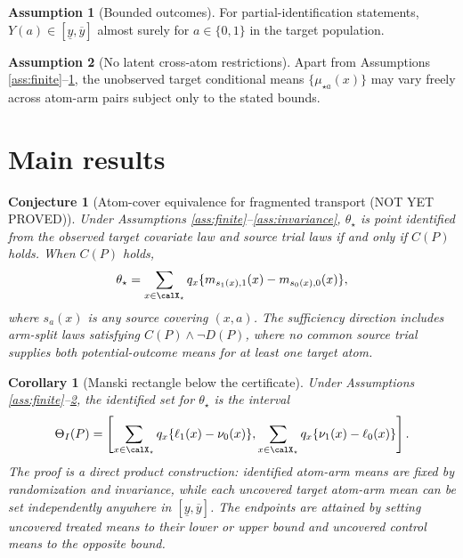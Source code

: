 \documentclass[11pt]{article}
\theoremstyle{definition}
\newtheorem{assumption}{Assumption}
\theoremstyle{plain}
\newtheorem{conjecture}{Conjecture}
\newtheorem{corollary}{Corollary}
\theoremstyle{remark}
\begin{document}
\begin{assumption}[Bounded outcomes]\label{ass:bounded}
For partial-identification statements, $Y(a)\in[\underline y,\overline y]$ almost surely for $a\in\{0,1\}$ in the target population.
\end{assumption}

\begin{assumption}[No latent cross-atom restrictions]\label{ass:no-cross}
Apart from Assumptions \ref{ass:finite}--\ref{ass:bounded}, the unobserved target conditional means $\{\mu_{\star a}(x)\}$ may vary freely across atom-arm pairs subject only to the stated bounds.
\end{assumption}

\section{Main results}
\begin{conjecture}[Atom-cover equivalence for fragmented transport (NOT YET PROVED)]\label{conj:cover-iff}
Under Assumptions \ref{ass:finite}--\ref{ass:invariance}, $\theta_\star$ is point identified from the observed target covariate law and source trial laws if and only if $C(P)$ holds. When $C(P)$ holds,
\[
\theta_\star=\sum_{x\in\calX_\star}q_x\{m_{s_1(x),1}(x)-m_{s_0(x),0}(x)\},
\]
where $s_a(x)$ is any source covering $(x,a)$.
The sufficiency direction includes arm-split laws satisfying $C(P)\wedge\neg D(P)$, where no common source trial supplies both potential-outcome means for at least one target atom.
\end{conjecture}

\begin{corollary}[Manski rectangle below the certificate]\label{cor:bounds}
Under Assumptions \ref{ass:finite}--\ref{ass:no-cross}, the identified set for $\theta_\star$ is the interval
\begin{equation}\label{eq:sharp-interval}
\Theta_I(P)=
\left[
\sum_{x\in\calX_\star}q_x\{\ell_1(x)-\nu_0(x)\},
\sum_{x\in\calX_\star}q_x\{\nu_1(x)-\ell_0(x)\}
\right].
\end{equation}
The proof is a direct product construction: identified atom-arm means are fixed by randomization and invariance, while each uncovered target atom-arm mean can be set independently anywhere in $[\underline y,\overline y]$. The endpoints are attained by setting uncovered treated means to their lower or upper bound and uncovered control means to the opposite bound.
\end{corollary}
\end{document}
